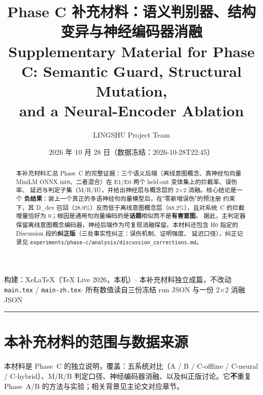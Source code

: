 \documentclass[11pt,a4paper]{article}
\title{\textbf{Phase C 补充材料：语义判别器、结构变异与神经编码器消融}\\[6pt]
\large Supplementary Material for Phase C: Semantic Guard, Structural Mutation,\\
and a Neural-Encoder Ablation}
\author{LINGSHU Project Team}
\date{2026 年 10 月 28 日（数据冻结：2026-10-28T22:45）}
\begin{document}
\maketitle

\begin{center}\small
构建：XeLaTeX（TeX Live 2026，本机）\quad$\cdot$\quad
本补充材料独立成篇，不改动 \texttt{main.tex} / \texttt{main-zh.tex}\quad$\cdot$\quad
所有数值读自三份冻结 run JSON 与一份 2$\times$2 消融 JSON
\end{center}

\vspace{2pt}
\hrule
\vspace{6pt}

\begin{abstract}
\noindent
本补充材料汇总 Phase~C 的完整证据：三个语义后端（离线意图概念、真神经句向量
MiniLM ONNX int8、二者混合）在 E1/E0 两个 held-out 变体集上的拦截率、误伤率、
延迟与判定子集（M/R/B），并给出神经层与概念层的 2$\times$2 消融。核心结论是一个
\textbf{负结果}：装上一个真正的多语神经句向量模型后，在"零新增误伤"的预注册
约束下，其 D\_dev 召回（28.9\%）反而低于离线意图概念层（68.2\%），且对系统~C
的拦截增量恰好为 0；根因是通用句向量编码的是\textbf{话题}相似而不是\textbf{有害意图}。
据此，主判定器保留离线意图概念编码器，神经后端作为可复现消融保留。本材料还包含
H0 指定的 Discussion 段的\textbf{纠正版}（三处事实性纠正：误伤机制、证明强度、
延迟口径），纠正记录见 \texttt{experiments/phase-c/analysis/discussion\_corrections.md}。
\end{abstract}

\section{本补充材料的范围与数据来源}

本材料是 Phase~C 的独立说明，覆盖：五系统对比（A / B / C-offline / C-neural /
C-hybrid）、M/R/B 判定口径、神经编码器消融、以及纠正版讨论。它\textbf{不}重复
Phase~A/B 的方法与实验；相关背景见主论文对应章节。
\end{document}
